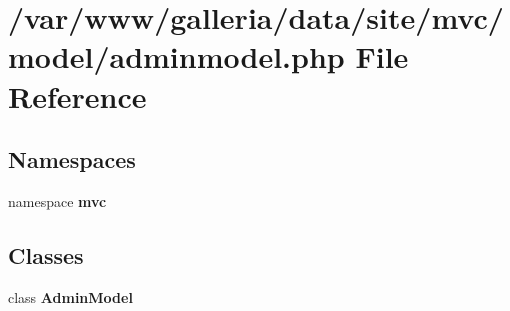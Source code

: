\section{/var/www/galleria/data/site/mvc/model/adminmodel.php File Reference}
\label{adminmodel_8php}
\subsection*{Namespaces}
\begin{CompactItemize}
\item 
namespace {\bf mvc}
\end{CompactItemize}
\subsection*{Classes}
\begin{CompactItemize}
\item 
class {\bf AdminModel}
\end{CompactItemize}
